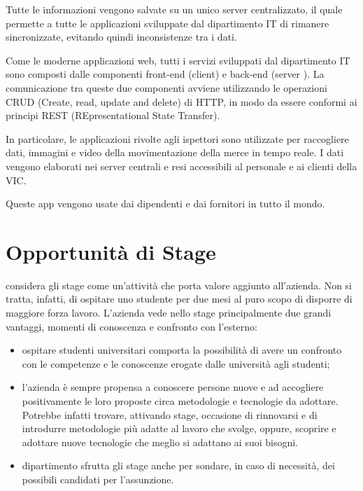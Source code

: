 	Tutte le informazioni vengono salvate su un unico server centralizzato, il quale permette
	a tutte le applicazioni sviluppate dal dipartimento IT di rimanere sincronizzate,
	evitando quindi inconsistenze tra i dati.
	
	Come le moderne applicazioni web, tutti i servizi sviluppati dal dipartimento IT sono
	composti dalle componenti front-end (client) e back-end (server ). La comunicazione tra
	queste due componenti avviene utilizzando le operazioni CRUD (Create, read, update
	and delete) di HTTP, in modo da essere conformi ai principi REST (REpresentational
	State Transfer).
	
	In particolare, le applicazioni rivolte agli ispettori sono utilizzate per raccogliere dati, 
	immagini e video della movimentazione della merce in tempo reale.
	I dati vengono elaborati nei server centrali e resi accessibili al personale e ai clienti della VIC.
	 
	Queste app vengono usate dai dipendenti e dai fornitori in tutto il mondo.
	

	
	

\section{Opportunità di Stage} 
	\vic{} considera gli stage come un’attività che porta valore aggiunto all’azienda.
	Non si tratta, infatti, di ospitare uno studente per due mesi al puro scopo di disporre di
	maggiore forza lavoro. L’azienda vede nello stage principalmente due grandi vantaggi,
	momenti di conoscenza e confronto con l’esterno:
	\begin{itemize}
		\item ospitare studenti universitari comporta la possibilità di avere un confronto con
			le competenze e le conoscenze erogate dalle università agli studenti;
		\item l’azienda è sempre propensa a conoscere persone nuove e ad accogliere positivamente
			le loro proposte circa metodologie e tecnologie da adottare. Potrebbe
			infatti trovare, attivando stage, occasione di rinnovarsi e di introdurre metodologie
			più adatte al lavoro che svolge, oppure, scoprire e adottare nuove tecnologie
			che meglio si adattano ai suoi bisogni.
		\item dipartimento sfrutta gli stage anche per sondare, in caso di necessità, dei possibili
		candidati per l’assunzione.
	\end{itemize}
